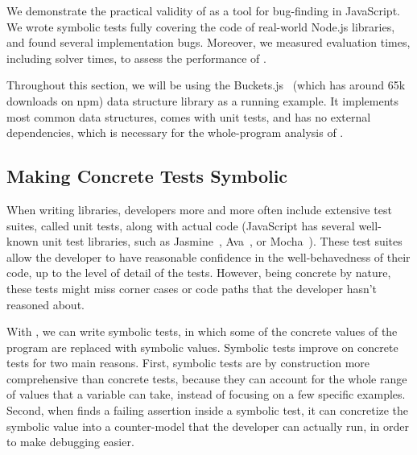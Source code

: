 
We demonstrate the practical validity of \cosette as a tool for bug-finding in JavaScript.
We wrote symbolic tests fully covering the code of real-world Node.js libraries, and found several  implementation bugs.
Moreover, we measured evaluation times, including solver times, to assess the performance of \cosette.

Throughout this section, we will be using the Buckets.js~\cite{buckets} (which has around 65k downloads on npm) data structure library as a running example.
It implements most common data structures, comes with unit tests, and has no external dependencies, which is necessary for the whole-program analysis of \cosette.

\subsection{Making Concrete Tests Symbolic}

When writing libraries, developers more and more often include extensive test suites, called unit tests, along with actual code (JavaScript has several well-known unit test libraries, such as Jasmine~\cite{jasmine}, Ava~\cite{ava}, or Mocha~\cite{mocha}).
These test suites allow the developer to have reasonable confidence in the well-behavedness of their code, up to the level of detail of the tests.
However, being concrete by nature, these tests might miss corner cases or code paths that the developer hasn't reasoned about.

With \cosette, we can write symbolic tests, in which some of the concrete values of the program are replaced with symbolic values.
Symbolic tests improve on concrete tests for two main reasons.
First, symbolic tests are by construction more comprehensive than concrete tests, because they can account for the whole range of values that a variable can take, instead of focusing on a few specific examples.
Second, when \cosette finds a failing assertion inside a symbolic test, it can concretize the symbolic value into a counter-model that the developer can actually run, in order to make debugging easier.


